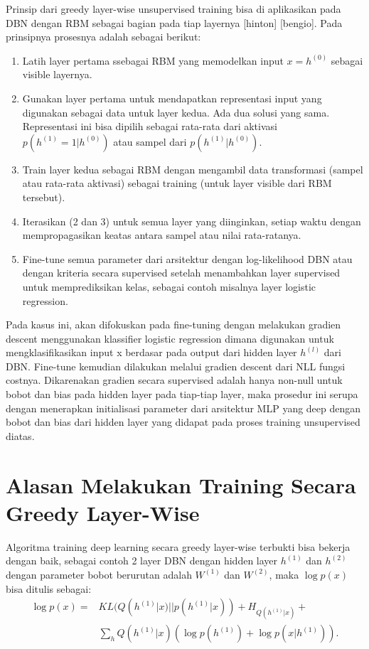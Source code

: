 \documentclass[12pt]{article}
\begin{document}
Prinsip dari greedy layer-wise unsupervised training bisa di aplikasikan pada DBN dengan RBM sebagai bagian pada tiap layernya [hinton] [bengio]. Pada prinsipnya prosesnya adalah sebagai berikut:
\begin{enumerate}
\item Latih layer pertama ssebagai RBM yang memodelkan input $x = h^{(0)}$ sebagai visible layernya.
\item Gunakan layer pertama untuk mendapatkan representasi input yang digunakan sebagai data untuk layer kedua. Ada dua solusi yang sama. Representasi ini bisa dipilih sebagai rata-rata dari aktivasi $p(h^{(1)}=1|h^{(0)})$ atau sampel dari $p(h^{(1)}|h^{(0)})$.
\item Train layer kedua sebagai RBM dengan mengambil data transformasi (sampel atau rata-rata aktivasi) sebagai training (untuk layer visible dari RBM tersebut).
\item Iterasikan (2 dan 3) untuk semua layer yang diinginkan, setiap waktu dengan mempropagasikan keatas antara sampel atau nilai rata-ratanya.
\item Fine-tune semua parameter dari arsitektur dengan log-likelihood DBN atau dengan kriteria secara supervised setelah menambahkan layer supervised untuk memprediksikan kelas, sebagai contoh misalnya layer logistic regression.
\end{enumerate}

Pada kasus ini, akan difokuskan pada fine-tuning dengan melakukan gradien descent menggunakan klassifier logistic regression dimana digunakan untuk mengklasifikasikan input x berdasar pada output dari hidden layer $h^{(l)}$ dari DBN. Fine-tune kemudian dilakukan melalui gradien descent dari NLL fungsi costnya. Dikarenakan gradien secara supervised adalah hanya non-null untuk bobot dan bias pada hidden layer pada tiap-tiap layer, maka prosedur ini serupa dengan menerapkan initialisasi parameter dari arsitektur MLP yang deep dengan bobot dan bias dari hidden layer yang didapat pada proses training unsupervised diatas.

\section{Alasan Melakukan Training Secara Greedy Layer-Wise}

Algoritma training deep learning secara greedy layer-wise terbukti bisa bekerja dengan baik, sebagai contoh 2 layer DBN dengan hidden layer $h^{(1)}$ dan $h^{(2)}$ dengan parameter bobot berurutan adalah $W^{(1)}$ dan $W^{(2)}$, \citep{hinton2006reducing} maka $\log
p(x)$ bisa ditulis sebagai:
\begin{equation}
\begin{aligned}
\log p(x) = &KL(Q(h^{(1)}|x)||p(h^{(1)}|x)) + H_{Q(h^{(1)}|x)} + \\
            &\sum_h Q(h^{(1)}|x)(\log p(h^{(1)}) + \log p(x|h^{(1)})).
\end{aligned}
\label{eq:equ2}
\end{equation}
\end{document}
